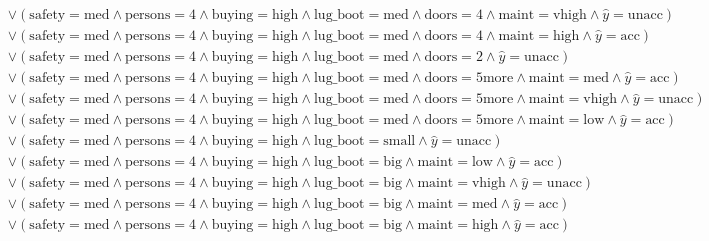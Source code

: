 \begin{scriptsize}
\[\begin{aligned}
  \\ & \lor (\text{safety}=\text{med} \land \text{persons}=\text{4} \land \text{buying}=\text{high} \land \text{lug_boot}=\text{med} \land \text{doors}=\text{4} \land \text{maint}=\text{vhigh} \land \hat{y}=\text{unacc})
  \\ & \lor (\text{safety}=\text{med} \land \text{persons}=\text{4} \land \text{buying}=\text{high} \land \text{lug_boot}=\text{med} \land \text{doors}=\text{4} \land \text{maint}=\text{high} \land \hat{y}=\text{acc})
  \\ & \lor (\text{safety}=\text{med} \land \text{persons}=\text{4} \land \text{buying}=\text{high} \land \text{lug_boot}=\text{med} \land \text{doors}=\text{2} \land \hat{y}=\text{unacc})
  \\ & \lor (\text{safety}=\text{med} \land \text{persons}=\text{4} \land \text{buying}=\text{high} \land \text{lug_boot}=\text{med} \land \text{doors}=\text{5more} \land \text{maint}=\text{med} \land \hat{y}=\text{acc})
  \\ & \lor (\text{safety}=\text{med} \land \text{persons}=\text{4} \land \text{buying}=\text{high} \land \text{lug_boot}=\text{med} \land \text{doors}=\text{5more} \land \text{maint}=\text{vhigh} \land \hat{y}=\text{unacc})
  \\ & \lor (\text{safety}=\text{med} \land \text{persons}=\text{4} \land \text{buying}=\text{high} \land \text{lug_boot}=\text{med} \land \text{doors}=\text{5more} \land \text{maint}=\text{low} \land \hat{y}=\text{acc})
  \\ & \lor (\text{safety}=\text{med} \land \text{persons}=\text{4} \land \text{buying}=\text{high} \land \text{lug_boot}=\text{small} \land \hat{y}=\text{unacc})
  \\ & \lor (\text{safety}=\text{med} \land \text{persons}=\text{4} \land \text{buying}=\text{high} \land \text{lug_boot}=\text{big} \land \text{maint}=\text{low} \land \hat{y}=\text{acc})
  \\ & \lor (\text{safety}=\text{med} \land \text{persons}=\text{4} \land \text{buying}=\text{high} \land \text{lug_boot}=\text{big} \land \text{maint}=\text{vhigh} \land \hat{y}=\text{unacc})
  \\ & \lor (\text{safety}=\text{med} \land \text{persons}=\text{4} \land \text{buying}=\text{high} \land \text{lug_boot}=\text{big} \land \text{maint}=\text{med} \land \hat{y}=\text{acc})
  \\ & \lor (\text{safety}=\text{med} \land \text{persons}=\text{4} \land \text{buying}=\text{high} \land \text{lug_boot}=\text{big} \land \text{maint}=\text{high} \land \hat{y}=\text{acc})

\end{aligned}\]
\end{scriptsize}
